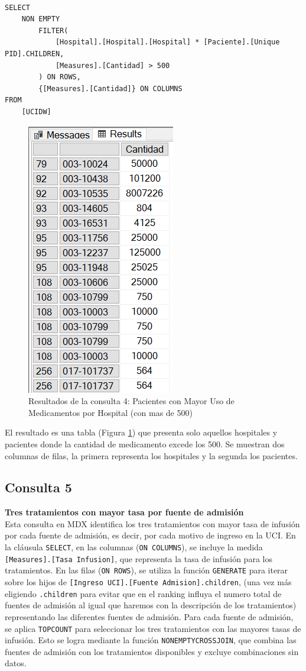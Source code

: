 \documentclass{article}
\begin{document}
\begin{lstlisting}[style=ddlstyle, label=lst:consulta4,caption=Consulta 4: Pacientes con Mayor Uso de Medicamentos por Hospital (con mas de 500)]
	
SELECT 
	NON EMPTY 
		FILTER(
			[Hospital].[Hospital].[Hospital] * [Paciente].[Unique PID].CHILDREN,
			[Measures].[Cantidad] > 500
		) ON ROWS, 
		{[Measures].[Cantidad]} ON COLUMNS
FROM 
	[UCIDW]
\end{lstlisting}

\begin{figure}[H]
	\centering
	\includegraphics[width=0.3\linewidth]{images/consulta4.png}
	\caption{Resultados de la consulta 4: Pacientes con Mayor Uso de Medicamentos por Hospital (con mas de 500)}
	\label{fig:consulta4}
\end{figure}

El resultado es una tabla (Figura \ref{fig:consulta4}) que presenta solo aquellos hospitales y pacientes donde la cantidad de medicamento excede los 500. Se muestran dos columnas de filas, la primera representa los hospitales y la segunda los pacientes.

\subsection{Consulta 5}

\textbf{Tres tratamientos con mayor tasa por fuente de admisión}
\\

 Esta consulta en MDX identifica los tres tratamientos con mayor tasa de infusión por cada fuente de admisión, es decir, por cada motivo de ingreso en la UCI. En la cláusula \texttt{SELECT}, en las columnas (\texttt{ON COLUMNS}), se incluye la medida \texttt{[Measures].[Tasa Infusion]}, que representa la tasa de infusión para los tratamientos. En las filas (\texttt{ON ROWS}), se utiliza la función \texttt{GENERATE} para iterar sobre los hijos de \texttt{[Ingreso UCI].[Fuente Admision].children}, (una vez más eligiendo \texttt{.children} para evitar que en el ranking influya el numero total de fuentes de admisión al igual que haremos con la descripción de los tratamientos) representando las diferentes fuentes de admisión. Para cada fuente de admisión, se aplica \texttt{TOPCOUNT} para seleccionar los tres tratamientos con las mayores tasas de infusión. Esto se logra mediante la función \texttt{NONEMPTYCROSSJOIN}, que combina las fuentes de admisión con los tratamientos disponibles y excluye combinaciones sin datos. 
\\ 
\end{document}
